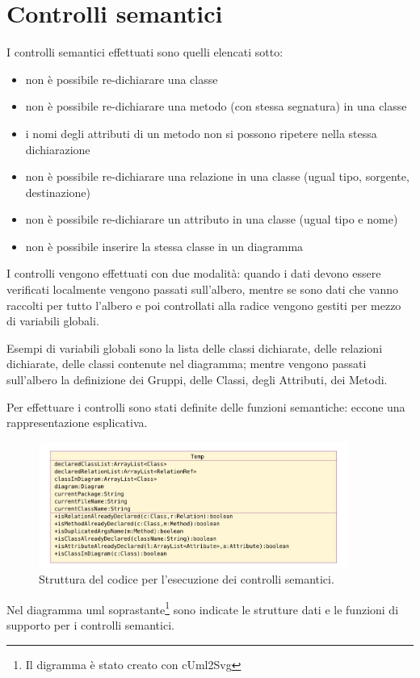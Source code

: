 \section{Controlli semantici}

I controlli semantici effettuati sono quelli elencati sotto:
\begin{itemize}
   \item non è possibile re-dichiarare una classe
   \item non è possibile re-dichiarare una metodo (con stessa segnatura) in una
   classe
   \item i nomi degli attributi di un metodo non si possono ripetere nella stessa dichiarazione
   \item non è possibile re-dichiarare una relazione in una classe (ugual tipo,
   sorgente, destinazione)
   \item non è possibile re-dichiarare un attributo in una classe (ugual tipo e
   nome)
   \item non è possibile inserire la stessa classe in un diagramma 
\end{itemize}


I controlli vengono effettuati con due modalità: quando i dati devono essere
verificati localmente vengono passati sull'albero, mentre se sono dati che vanno
raccolti per tutto l'albero e poi controllati alla radice vengono gestiti per
mezzo di variabili globali.

Esempi di variabili globali sono la lista delle classi dichiarate, delle
relazioni dichiarate, delle classi contenute nel diagramma; mentre vengono passati
sull'albero la
definizione dei Gruppi, delle Classi, degli Attributi, dei Metodi.

Per effettuare i controlli sono stati definite delle funzioni semantiche: eccone
una rappresentazione esplicativa.

\begin{figure}[htp]
\begin{center}
  \includegraphics[width=0.9\textwidth]{img/uml_compilatore}
  \caption[labelInTOC]{Struttura del codice per l'esecuzione dei controlli semantici.}
\end{center}
\end{figure}

Nel diagramma uml soprastante\footnote{Il digramma è stato creato con cUml2Svg} sono
indicate le strutture dati e le funzioni di supporto per i controlli semantici.
